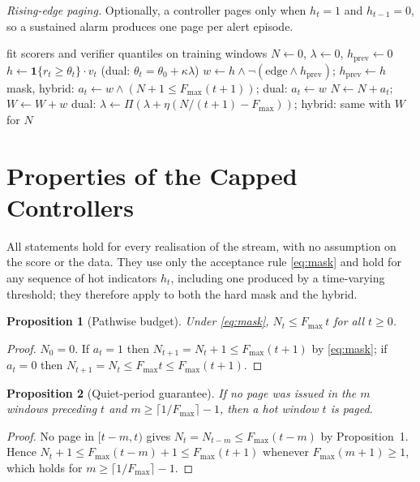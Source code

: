\documentclass[journal,10pt,twocolumn]{IEEEtran}
\newtheorem{proposition}{Proposition}
\newcommand{\Fmax}{F_{\max}}
\begin{document}
\emph{Rising-edge paging.} Optionally, a controller pages only when $h_t=1$ and $h_{t-1}=0$, so a sustained alarm produces one page per alert episode.

\begin{algorithm}[t]
\caption{Budgeted paging over a window stream}
\label{alg:pipe}
\begin{algorithmic}[1]
\STATE fit scorers and verifier quantiles on training windows
\STATE $N\leftarrow 0$, $\lambda\leftarrow 0$, $h_{\mathrm{prev}}\leftarrow 0$
\STATE $h\leftarrow\mathbf{1}\{r_t\ge\theta_t\}\cdot v_t$ \hfill(dual: $\theta_t=\theta_0+\kappa\lambda$)
\STATE $w\leftarrow h\wedge\neg(\text{edge}\wedge h_{\mathrm{prev}})$; $h_{\mathrm{prev}}\leftarrow h$
\STATE mask, hybrid: $a_t\leftarrow w\wedge(N+1\le\Fmax(t+1))$; dual: $a_t\leftarrow w$
\STATE $N\leftarrow N+a_t$; $W\leftarrow W+w$
\STATE dual: $\lambda\leftarrow\Pi(\lambda+\eta(N/(t+1)-\Fmax))$; hybrid: same with $W$ for $N$
\ENDFOR
\end{algorithmic}
\end{algorithm}

\section{Properties of the Capped Controllers}
\label{sec:theory}
All statements hold for every realisation of the stream, with no assumption on the score or the data. They use only the acceptance rule \eqref{eq:mask} and hold for any sequence of hot indicators $h_t$, including one produced by a time-varying threshold; they therefore apply to both the hard mask and the hybrid.

\begin{proposition}[Pathwise budget]
Under \eqref{eq:mask}, $N_t\le\Fmax\,t$ for all $t\ge 0$.
\end{proposition}
\begin{proof}
$N_0=0$. If $a_t=1$ then $N_{t+1}=N_t+1\le\Fmax(t+1)$ by \eqref{eq:mask}; if $a_t=0$ then $N_{t+1}=N_t\le\Fmax t\le\Fmax(t+1)$.
\end{proof}

\begin{proposition}[Quiet-period guarantee]
If no page was issued in the $m$ windows preceding $t$ and $m\ge\lceil1/\Fmax\rceil-1$, then a hot window $t$ is paged.
\end{proposition}
\begin{proof}
No page in $[t-m,t)$ gives $N_t=N_{t-m}\le\Fmax(t-m)$ by Proposition~1. Hence $N_t+1\le\Fmax(t-m)+1\le\Fmax(t+1)$ whenever $\Fmax(m+1)\ge1$, which holds for $m\ge\lceil1/\Fmax\rceil-1$.
\end{proof}
\end{document}
